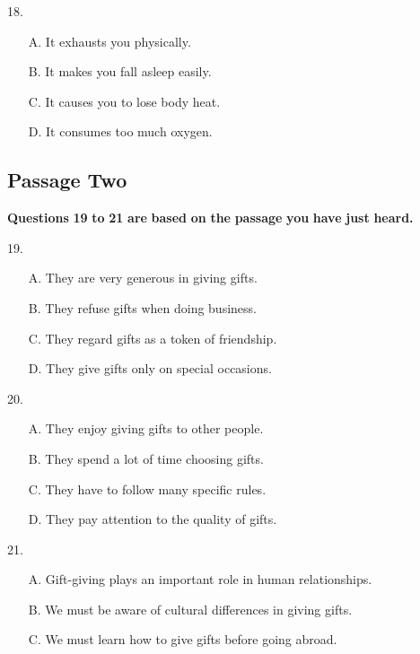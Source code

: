 \documentclass[UTF8,11pt]{ctexart}
\begin{document}
18.


\begin{itemize}[leftmargin=2em,itemsep=.2em,topsep=.4em]\item[A.] It exhausts you physically.
\item[B.] It makes you fall asleep easily.
\item[C.] It causes you to lose body heat.
\item[D.] It consumes too much oxygen.
\end{itemize}

\subsection*{\textbf{Passage} \textbf{Two}}


\textbf{Questions} \textbf{19} \textbf{to} \textbf{21} \textbf{are} \textbf{based} \textbf{on} \textbf{the} \textbf{passage} \textbf{you} \textbf{have} \textbf{just} \textbf{heard.}


19.


\begin{itemize}[leftmargin=2em,itemsep=.2em,topsep=.4em]\item[A.] They are very generous in giving gifts.
\item[B.] They refuse gifts when doing business.
\item[C.] They regard gifts as a token of friendship.
\item[D.] They give gifts only on special occasions.
\end{itemize}

20.


\begin{itemize}[leftmargin=2em,itemsep=.2em,topsep=.4em]\item[A.] They enjoy giving gifts to other people.
\item[B.] They spend a lot of time choosing gifts.
\item[C.] They have to follow many specific rules.
\item[D.] They pay attention to the quality of gifts.
\end{itemize}

21.


\begin{itemize}[leftmargin=2em,itemsep=.2em,topsep=.4em]\item[A.] Gift-giving plays an important role in human relationships.
\item[B.] We must be aware of cultural differences in giving gifts.
\item[C.] We must learn how to give gifts before going abroad.
\end{itemize}
\end{document}
